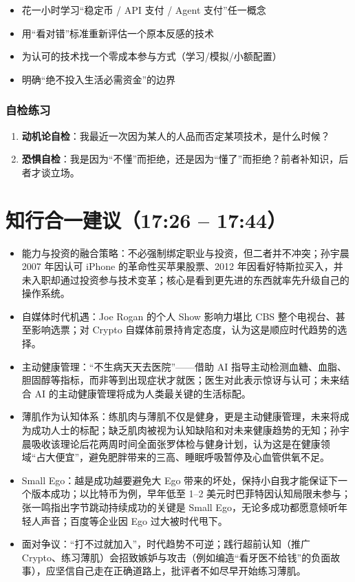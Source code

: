 \begin{itemize}
\tightlist
\item[$\square$]
  花一小时学习``稳定币 / API 支付 / Agent 支付''任一概念
\item[$\square$]
  用``看对错''标准重新评估一个原本反感的技术
\item[$\square$]
  为认可的技术找一个零成本参与方式（学习/模拟/小额配置）
\item[$\square$]
  明确``绝不投入生活必需资金''的边界
\end{itemize}

\subsubsection{自检练习}

\begin{enumerate}
\def\labelenumi{\arabic{enumi}.}
\tightlist
\item
  \textbf{动机论自检}：我最近一次因为某人的人品而否定某项技术，是什么时候？
\item
  \textbf{恐惧自检}：我是因为``不懂''而拒绝，还是因为``懂了''而拒绝？前者补知识，后者才谈立场。
\end{enumerate}

\section{知行合一建议（17:26 --
17:44）}

\begin{itemize}
\tightlist
\item
  能力与投资的融合策略：不必强制绑定职业与投资，但二者并不冲突；孙宇晨
  2007 年因认可 iPhone 的革命性买苹果股票、2012
  年因看好特斯拉买入，并未入职却通过投资参与技术变革；核心是看到更先进的东西就率先升级自己的操作系统。
\item
  自媒体时代机遇：Joe Rogan 的个人 Show 影响力堪比 CBS
  整个电视台、甚至影响选票；对 Crypto
  自媒体前景持肯定态度，认为这是顺应时代趋势的选择。
\item
  主动健康管理：``不生病天天去医院''------借助 AI
  指导主动检测血糖、血脂、胆固醇等指标，而非等到出现症状才就医；医生对此表示惊讶与认可；未来结合
  AI 的主动健康管理将成为人类最关键的生活标配。
\item
  薄肌作为认知体系：练肌肉与薄肌不仅是健身，更是主动健康管理，未来将成为成功人士的标配；缺乏肌肉被视为认知缺陷和对未来健康趋势的无知；孙宇晨吸收该理论后花两周时间全面张罗体检与健身计划，认为这是在健康领域``占大便宜''，避免肥胖带来的三高、睡眠呼吸暂停及心血管供氧不足。
\item
  Small Ego：越是成功越要避免大 Ego
  带来的坏处，保持小自我才能保证下一个版本成功；以比特币为例，早年低至
  1--2 美元时巴菲特因认知局限未参与；张一鸣指出字节跳动持续成功的关键是
  Small Ego，无论多成功都愿意倾听年轻人声音；百度等企业因 Ego
  过大被时代甩下。
\item
  面对争议：``打不过就加入''，时代趋势不可逆；践行超前认知（推广
  Crypto、练习薄肌）会招致嫉妒与攻击（例如编造``看牙医不给钱''的负面故事），应坚信自己走在正确道路上，批评者不如尽早开始练习薄肌。
\end{itemize}

